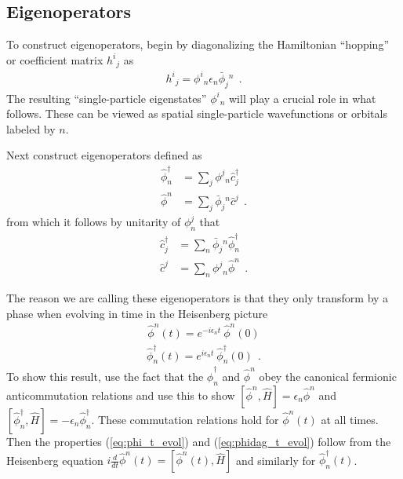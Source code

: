 \documentclass[aps, superscriptaddress, floatfix, onecolumn]{revtex4-2}
\begin{document}
\subsection{Eigenoperators}

To construct eigenoperators, begin by diagonalizing the Hamiltonian ``hopping'' or coefficient matrix $h^i\!_j$ as
\begin{align}
h^i\!_j = \phi^i\!_n \epsilon_n \bar{\phi}_j\!^n \ \ .
\end{align}
The resulting ``single-particle eigenstates'' $\phi^i\!_n$ will play a crucial role in what follows. These can be viewed as spatial single-particle wavefunctions or orbitals labeled by $n$.

Next construct eigenoperators defined as
\begin{align}
\hat{\phi}^\dagger_n & = \sum_j \phi^j\!_n \hat{c}^\dagger_j \label{eq:phidag_op} \\ 
\hat{\phi}^n & = \sum_j \bar{\phi}_j\!^n \hat{c}^j \label{eq:phi_op}  \ \ .
\end{align}
from which it follows by unitarity of $\phi^j_n$ that 
\begin{align}
\hat{c}^\dagger_j & = \sum_n \bar{\phi}_j\!^n \hat{\phi}^\dagger_n  \label{eq:cdag_phi_transform} \\ 
\hat{c}^j & = \sum_n \phi^j\!_n \hat{\phi}^n \ \ . \label{eq:c_phi_transform}
\end{align}

The reason we are calling these eigenoperators is that they only transform by a phase when evolving in time in the Heisenberg picture
\begin{align}
\boxed{\hat{\phi}^n(t) =  e^{-i \epsilon_n t}\ \hat{\phi}^n(0)} \label{eq:phi_t_evol}
\end{align}
\begin{align}
\boxed{\hat{\phi}^\dagger_n(t) =  e^{i \epsilon_n t}\ \hat{\phi}^\dagger_n(0)} \label{eq:phidag_t_evol} \ \ .
\end{align}
To show this result, use the fact that the $\hat{\phi}^\dagger_n$ and $\hat{\phi}^n$ obey the canonical fermionic anticommutation relations and use this to show $[\hat{\phi}^n, \hat{H}] = \epsilon_n \hat{\phi}^n$ and $[\hat{\phi}^\dagger_n, \hat{H}] = -\epsilon_n \hat{\phi}^\dagger_n$. These commutation relations hold for $\hat{\phi}^n(t)$ at all times. Then the properties (\ref{eq:phi_t_evol}) and (\ref{eq:phidag_t_evol}) follow from the Heisenberg equation $i \frac{d}{dt} \hat{\phi}^n(t) = [\hat{\phi}^n(t), \hat{H}]$ and similarly for $\hat{\phi}^\dagger_n(t)$.
\end{document}
